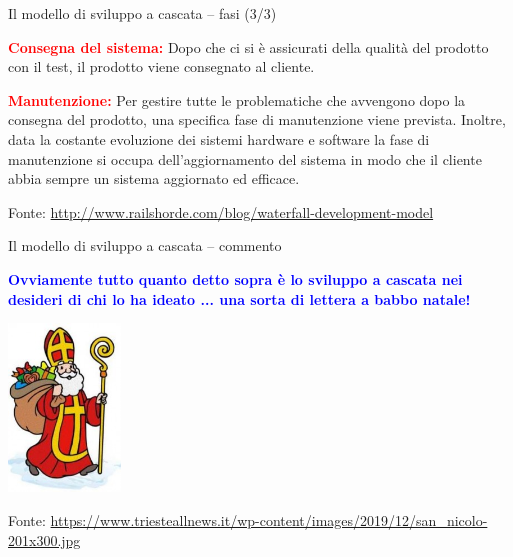 \documentclass{beamer}
\begin{document}
\begin{frame}{\centerline{Il modello di sviluppo a cascata -- fasi (3/3)}}



\textcolor{red}{\bf Consegna del sistema:} Dopo che ci si \`{e} assicurati della qualit\`{a} del prodotto con il test, il prodotto viene consegnato al cliente.
\newline

\textcolor{red}{\bf Manutenzione:} Per gestire tutte le problematiche che avvengono dopo la consegna del prodotto, una specifica fase di manutenzione viene prevista. Inoltre, data la costante evoluzione dei sistemi hardware e software la fase di manutenzione si occupa dell'aggiornamento del sistema in modo che il cliente abbia sempre un sistema aggiornato ed efficace.

\newline

\begin{center}
\tiny
Fonte: \url{http://www.railshorde.com/blog/waterfall-development-model}
\end{center}

\end{frame}

\begin{frame}{\centerline{Il modello di sviluppo a cascata -- commento}}

\textcolor{blue}{\bf Ovviamente tutto quanto detto sopra \`{e} lo sviluppo a cascata nei desideri di chi lo ha ideato ... una sorta di lettera a babbo natale!}

\begin{center}
\includegraphics[width=30mm]{A2022.IDSEPC.ProcessoDiProduzione/san_nicolo-201x300.jpg}
\end{center}
\vspace{0.5cm}

\begin{center}
\tiny
Fonte: \url{https://www.triesteallnews.it/wp-content/images/2019/12/san_nicolo-201x300.jpg}
\end{center}


\end{frame}
\end{document}
